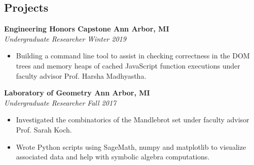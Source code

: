 \documentclass[margin,line]{resume}
\begin{document}
\begin{resume}
	\sectionbreak
	\section{\mysidestyle Projects}
	
	\textbf{Engineering Honors Capstone \href{https://github.com/jonathoma/js-correctness-checker}{\faGithub} \hfill Ann Arbor, MI} \\\vspace{1mm}%
	\textsl{Undergraduate Researcher} \hfill \textsl{Winter 2019}
	\begin{itemize}[leftmargin=4mm]
		\item Building a command line tool to assist in checking correctness in the DOM trees and memory heaps of cached JavaScript function executions under faculty advisor Prof. Harsha Madhyastha.
	\end{itemize}
	
	\textbf{Laboratory of Geometry \href{https://github.com/jonathoma/LogM}{\faGithub} \hfill Ann Arbor, MI} \\\vspace{1mm}%
	\textsl{Undergraduate Researcher} \hfill \textsl{Fall 2017}
	\begin{itemize}[leftmargin=4mm]
		\item Investigated the combinatorics of the Mandlebrot set under faculty advisor Prof. Sarah Koch.
		\item Wrote Python scripts using SageMath, numpy and matplotlib to visualize associated data and help with symbolic algebra computations. 
	\end{itemize}
	

\end{resume}
\end{document}
